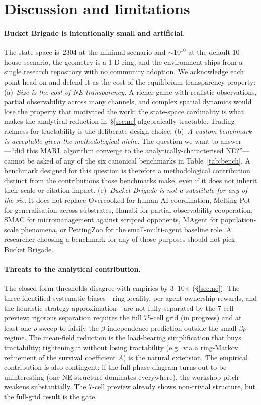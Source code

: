 \documentclass{anvil-paper}
\begin{document}
\section{Discussion and limitations}
\label{sec:discussion}

\paragraph{Bucket Brigade is intentionally small and artificial.}
The state space is~$2304$ at the minimal scenario and $\sim\!10^{10}$ at the
default 10-house scenario, the geometry is a 1-D ring, and the environment
ships from a single research repository with no community adoption. We
acknowledge each point head-on and defend it as the cost of the
equilibrium-transparency property:
(a)~\emph{Size is the cost of NE transparency.} A richer game with realistic
observations, partial observability across many channels, and complex spatial
dynamics would lose the property that motivated the work; the state-space
cardinality is what makes the analytical reduction in~\S\ref{sec:ne}
algebraically tractable. Trading richness for tractability is the deliberate
design choice.
(b)~\emph{A custom benchmark is acceptable given the methodological niche.}
The question we want to answer---``did this MARL algorithm converge to the
analytically-characterised NE?''---cannot be asked of any of the six
canonical benchmarks in Table~\ref{tab:bench}. A benchmark designed for this
question is therefore a methodological contribution distinct from the
contributions those benchmarks make, even if it does not inherit their scale
or citation impact.
(c)~\emph{Bucket Brigade is not a substitute for any of the six.} It does
not replace Overcooked for human-AI coordination, Melting Pot for
generalisation across substrates, Hanabi for partial-observability
cooperation, SMAC for micromanagement against scripted opponents, MAgent
for population-scale phenomena, or PettingZoo for the small-multi-agent
baseline role. A researcher choosing a benchmark for any of those purposes
should not pick Bucket Brigade.

\paragraph{Threats to the analytical contribution.}
The closed-form thresholds disagree with empirics by 3--10$\times$
(\S\ref{sec:ne}). The three identified systematic biases---ring locality,
per-agent ownership rewards, and the heuristic-strategy approximation---are
not fully separated by the 7-cell preview; rigorous separation requires the
full 75-cell grid (in progress) and at least one $\rho$-sweep to falsify the
$\beta$-independence prediction outside the small-$\beta\rho$ regime. The
mean-field reduction is the load-bearing simplification that buys
tractability; tightening it without losing tractability (e.g.\ via a
ring-Markov refinement of the survival coefficient $A$) is the natural
extension. The empirical contribution is also contingent: if the full phase
diagram turns out to be uninteresting (one NE structure dominates
everywhere), the workshop pitch weakens substantially. The 7-cell preview
already shows non-trivial structure, but the full-grid result is the gate.
\end{document}
